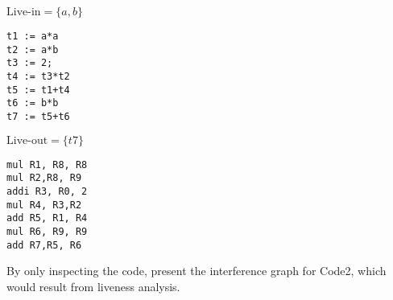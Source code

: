 \documentclass[docid=2020]{comp_test2}
\begin{document}

\begin{minipage}{0.45\textwidth}
    $\text{Live-in} =\{a,b\}$

    \begin{lstlisting}[caption=Code2]
t1 := a*a
t2 := a*b
t3 := 2;
t4 := t3*t2
t5 := t1+t4
t6 := b*b
t7 := t5+t6
    \end{lstlisting}

    $\text{Live-out} = \{t7\}$
\end{minipage} \hspace{3em}
\begin{minipage}{0.45\textwidth}
    \begin{lstlisting}[caption=Code3]
mul R1, R8, R8
mul R2,R8, R9
addi R3, R0, 2
mul R4, R3,R2
add R5, R1, R4
mul R6, R9, R9
add R7,R5, R6
    \end{lstlisting}
\end{minipage}

\question
By only inspecting the code, present the interference graph for Code2, which would result from liveness analysis. 

\ansseparator
\end{document}
